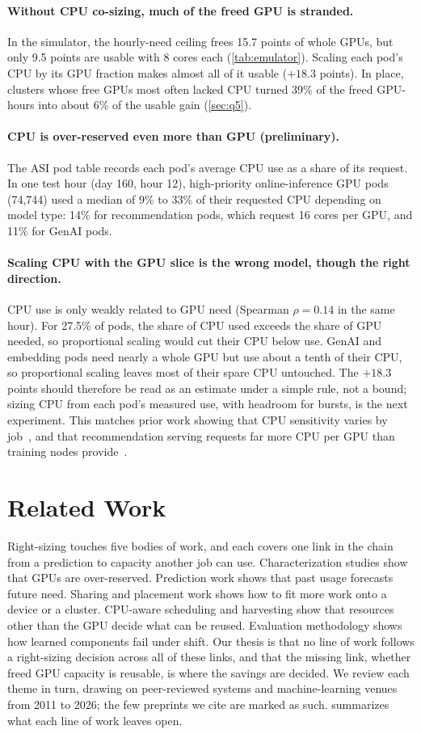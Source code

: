 \documentclass[10pt]{article}
\newcommand{\finding}[1]{\paragraph{#1}}
\begin{document}
\finding{Without CPU co-sizing, much of the freed GPU is stranded.} In the simulator, the hourly-need ceiling frees 15.7 points of whole GPUs, but only 9.5 points are usable with 8 cores each (\cref{tab:emulator}). Scaling each pod's CPU by its GPU fraction makes almost all of it usable ($+18.3$ points). In place, clusters whose free GPUs most often lacked CPU turned 39\% of the freed GPU-hours into about 6\% of the usable gain (\cref{sec:q5}).

\finding{CPU is over-reserved even more than GPU (preliminary).} The ASI pod table records each pod's average CPU use as a share of its request. In one test hour (day 160, hour 12), high-priority online-inference GPU pods (74{,}744) used a median of 9\% to 33\% of their requested CPU depending on model type: 14\% for recommendation pods, which request 16 cores per GPU, and 11\% for GenAI pods.

\finding{Scaling CPU with the GPU slice is the wrong model, though the right direction.} CPU use is only weakly related to GPU need (Spearman $\rho = 0.14$ in the same hour). For 27.5\% of pods, the share of CPU used exceeds the share of GPU needed, so proportional scaling would cut their CPU below use. GenAI and embedding pods need nearly a whole GPU but use about a tenth of their CPU, so proportional scaling leaves most of their spare CPU untouched. The $+18.3$ points should therefore be read as an estimate under a simple rule, not a bound; sizing CPU from each pod's measured use, with headroom for bursts, is the next experiment. This matches prior work showing that CPU sensitivity varies by job~\citep{mohan2022synergy,zhao2020coda}, and that recommendation serving requests far more CPU per GPU than training nodes provide~\citep{yang2025prism}.

\section{Related Work}
\label{sec:related}

Right-sizing touches five bodies of work, and each covers one link in the chain from a prediction to capacity another job can use. Characterization studies show that GPUs are over-reserved. Prediction work shows that past usage forecasts future need. Sharing and placement work shows how to fit more work onto a device or a cluster. CPU-aware scheduling and harvesting show that resources other than the GPU decide what can be reused. Evaluation methodology shows how learned components fail under shift. Our thesis is that no line of work follows a right-sizing decision across all of these links, and that the missing link, whether freed GPU capacity is reusable, is where the savings are decided. We review each theme in turn, drawing on peer-reviewed systems and machine-learning venues from 2011 to 2026; the few preprints we cite are marked as such.  summarizes what each line of work leaves open.
\end{document}
